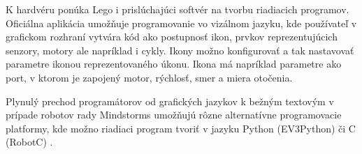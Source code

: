 K hardvéru ponúka Lego i prislúchajúci softvér na tvorbu riadiacich programov. Oficiálna aplikácia umožňuje programovanie vo vizálnom jazyku, kde používateľ v grafickom rozhraní vytvára kód ako postupnosť ikon, prvkov reprezentujúcich senzory, motory ale napríklad i cykly. Ikony možno konfigurovať a tak nastavovať parametre ikonou reprezentovaného úkonu. Ikona  má napríklad parametre ako port, v ktorom je zapojený motor, rýchlosť, smer a miera otočenia.

Plynulý prechod programátorov od grafických jazykov k bežným textovým v prípade robotov rady Mindstorms umožňujú rôzne alternatívne programovacie platformy, kde možno riadiaci program tvoriť v jazyku Python (EV3Python) či C (RobotC) \cite{LegoAlternatives}.









